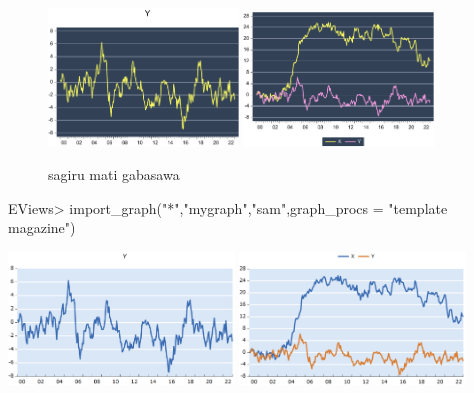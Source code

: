 \documentclass[
]{article}
\newenvironment{Shaded}{\begin{snugshade}}{\end{snugshade}}
\newcommand{\AttributeTok}[1]{\textcolor[rgb]{0.77,0.63,0.00}{#1}}
\newcommand{\FunctionTok}[1]{\textcolor[rgb]{0.00,0.00,0.00}{#1}}
\newcommand{\NormalTok}[1]{#1}
\newcommand{\SpecialCharTok}[1]{\textcolor[rgb]{0.00,0.00,0.00}{#1}}
\newcommand{\StringTok}[1]{\textcolor[rgb]{0.31,0.60,0.02}{#1}}
\begin{document}
\begin{figure}[h]

{\centering \includegraphics[width=0.45\textwidth]{test_engEviews_files/figure-latex//sagirumati-sam-eviewsr_graph} \includegraphics[width=0.45\textwidth]{test_engEviews_files/figure-latex//sagirumati-sam-graph1} 

}

\caption{sagiru mati gabasawa}\label{fig:sagirumati}
\end{figure}

\begin{Shaded}
\begin{Highlighting}[]
\NormalTok{EViews}\SpecialCharTok{\textgreater{}} \FunctionTok{import\_graph}\NormalTok{(}\StringTok{"*"}\NormalTok{,}\StringTok{"mygraph"}\NormalTok{,}\StringTok{"sam"}\NormalTok{,}\AttributeTok{graph\_procs =} \StringTok{"template magazine"}\NormalTok{)}
\end{Highlighting}
\end{Shaded}

\includegraphics[width=0.45\textwidth]{test_engEviews_files/figure-latex//grap-EVIEWSR_GRAPH} \includegraphics[width=0.45\textwidth]{test_engEviews_files/figure-latex//grap-GRAPH1}
\end{document}
